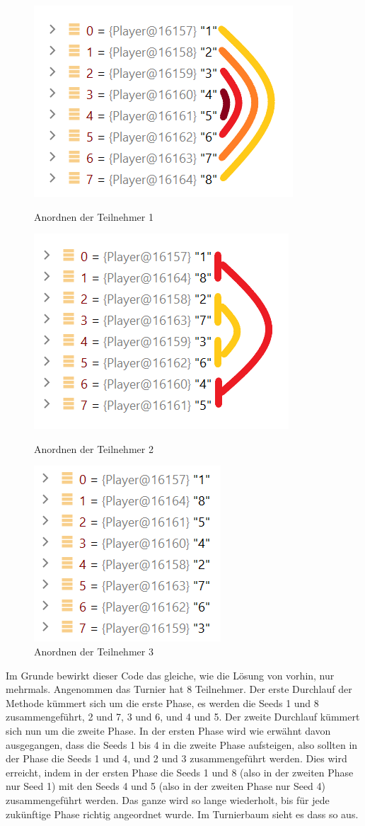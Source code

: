 \begin{figure}[H]
    \includegraphics[scale=0.8]{pics/backend/elimination/seeding_1.png}
    \caption{Anordnen der Teilnehmer 1}
    \includegraphics[scale=0.8]{pics/backend/elimination/seeding_2.png}
    \caption{Anordnen der Teilnehmer 2}
    \includegraphics[scale=0.8]{pics/backend/elimination/seeding_3.png}
    \caption{Anordnen der Teilnehmer 3}
\end{figure}

Im Grunde bewirkt dieser Code das gleiche, wie die Lösung von vorhin, nur mehrmals.
Angenommen das Turnier hat 8 Teilnehmer.
Der erste Durchlauf der Methode kümmert sich um die erste Phase, es werden die Seeds 1 und 8 zusammengeführt, 2 und 7, 3 und 6, und 4 und 5.
Der zweite Durchlauf kümmert sich nun um die zweite Phase. In der ersten Phase wird wie erwähnt davon ausgegangen, dass die Seeds 1 bis 4 in die zweite 
Phase aufsteigen, also sollten in der Phase die Seeds 1 und 4, und 2 und 3 zusammengeführt werden.
Dies wird erreicht, indem in der ersten Phase die Seeds 1 und 8 (also in der zweiten Phase nur Seed 1) mit den 
Seeds 4 und 5 (also in der zweiten Phase nur Seed 4) zusammengeführt werden. Das ganze wird so lange wiederholt, bis für jede zukünftige Phase richtig 
angeordnet wurde. Im Turnierbaum sieht es dass so aus.

